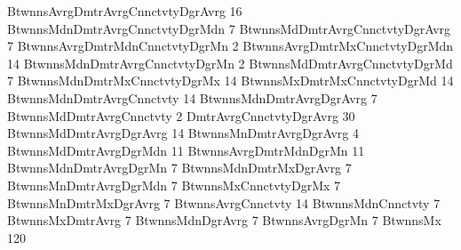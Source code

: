 BtwnnsAvrgDmtrAvrgCnnctvtyDgrAvrg 16
BtwnnsMdnDmtrAvrgCnnctvtyDgrMdn 7
BtwnnsMdDmtrAvrgCnnctvtyDgrAvrg 7
BtwnnsAvrgDmtrMdnCnnctvtyDgrMn 2
BtwnnsAvrgDmtrMxCnnctvtyDgrMdn 14
BtwnnsMdnDmtrAvrgCnnctvtyDgrMn 2
BtwnnsMdDmtrAvrgCnnctvtyDgrMd 7
BtwnnsMdnDmtrMxCnnctvtyDgrMx 14
BtwnnsMxDmtrMxCnnctvtyDgrMd 14
BtwnnsMdnDmtrAvrgCnnctvty 14
BtwnnsMdnDmtrAvrgDgrAvrg 7
BtwnnsMdDmtrAvrgCnnctvty 2
DmtrAvrgCnnctvtyDgrAvrg 30
BtwnnsMdDmtrAvrgDgrAvrg 14
BtwnnsMnDmtrAvrgDgrAvrg 4
BtwnnsMdDmtrAvrgDgrMdn 11
BtwnnsAvrgDmtrMdnDgrMn 11
BtwnnsMdnDmtrAvrgDgrMn 7
BtwnnsMdnDmtrMxDgrAvrg 7
BtwnnsMnDmtrAvrgDgrMdn 7
BtwnnsMxCnnctvtyDgrMx 7
BtwnnsMnDmtrMxDgrAvrg 7
BtwnnsAvrgCnnctvty 14
BtwnnsMdnCnnctvty 7
BtwnnsMxDmtrAvrg 7
BtwnnsMdnDgrAvrg 7
BtwnnsAvrgDgrMn 7
BtwnnsMx 120
